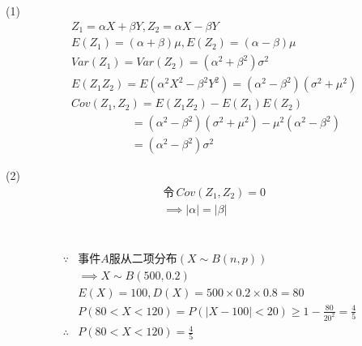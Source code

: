 \documentclass{article}
\begin{document}
(1)
\begin{equation}
    \begin{aligned}
        &Z_1=\alpha X+\beta Y,Z_2=\alpha X-\beta Y\\\nonumber
        &E(Z_1)=(\alpha+\beta)\mu,E(Z_2)=(\alpha-\beta)\mu\\
        &Var(Z_1)=Var(Z_2)=(\alpha^2+\beta^2)\sigma^2\\
        &E(Z_1Z_2)=E(\alpha^2X^2-\beta^2Y^2)=(\alpha^2-\beta^2)(\sigma^2+\mu^2)\\
        &Cov(Z_1,Z_2)=E(Z_1Z_2)-E(Z_1)E(Z_2)\\
        &\qquad\qquad\quad\;=(\alpha^2-\beta^2)(\sigma^2+\mu^2)-\mu^2(\alpha^2-\beta^2)\\
        &\qquad\qquad\quad\;=(\alpha^2-\beta^2)\sigma^2
    \end{aligned}
\end{equation}

(2)
\begin{equation}
    \begin{aligned}
        &\mbox{令}\,Cov(Z_1,Z_2)=0\\
        &\implies|\alpha|=|\beta|\nonumber
    \end{aligned}
\end{equation}

\section{ }

\begin{equation}
    \begin{aligned}
         \because&\mbox{事件}A\mbox{服从二项分布}(X\sim B(n,p)) \\\nonumber
         &\implies X\sim B(500,0.2)\\
         &E(X)=100,D(X)=500\times0.2\times0.8=80\\
         &P(80<X<120)=P(|X-100|<20)\ge1-\frac{80}{20^2}=\frac{4}{5}\\
         \therefore&P(80<X<120)=\frac{4}{5}
    \end{aligned}
\end{equation}
\end{document}
